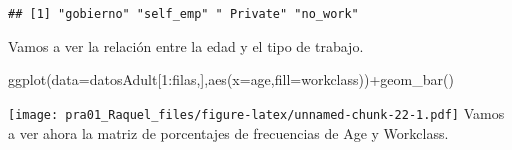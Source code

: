\documentclass[]{article}
\newenvironment{Shaded}{\begin{snugshade}}{\end{snugshade}}
\newcommand{\ControlFlowTok}[1]{\textcolor[rgb]{0.94,0.87,0.69}{#1}}
\newcommand{\DataTypeTok}[1]{\textcolor[rgb]{0.87,0.87,0.75}{#1}}
\newcommand{\DecValTok}[1]{\textcolor[rgb]{0.86,0.86,0.80}{#1}}
\newcommand{\KeywordTok}[1]{\textcolor[rgb]{0.94,0.87,0.69}{#1}}
\newcommand{\NormalTok}[1]{\textcolor[rgb]{0.80,0.80,0.80}{#1}}
\newcommand{\OperatorTok}[1]{\textcolor[rgb]{0.94,0.94,0.82}{#1}}
\begin{document}
\begin{Shaded}
\end{Shaded}

\begin{verbatim}
## [1] "gobierno" "self_emp" " Private" "no_work"
\end{verbatim}

Vamos a ver la relación entre la edad y el tipo de trabajo.

\begin{Shaded}
\begin{Highlighting}[]
\KeywordTok{ggplot}\NormalTok{(}\DataTypeTok{data=}\NormalTok{datosAdult[}\DecValTok{1}\OperatorTok{:}\NormalTok{filas,],}\KeywordTok{aes}\NormalTok{(}\DataTypeTok{x=}\NormalTok{age,}\DataTypeTok{fill=}\NormalTok{workclass))}\OperatorTok{+}\KeywordTok{geom\_bar}\NormalTok{()}
\end{Highlighting}
\end{Shaded}

\texttt{[image: pra01\_Raquel\_files/figure-latex/unnamed-chunk-22-1.pdf]}
Vamos a ver ahora la matriz de porcentajes de frecuencias de Age y
Workclass.

\begin{Shaded}
\end{Shaded}
\end{document}
